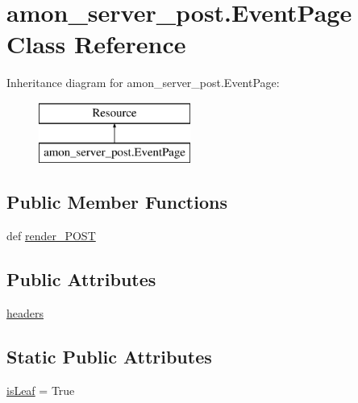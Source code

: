 \hypertarget{classamon__server__post_1_1_event_page}{\section{amon\-\_\-server\-\_\-post.\-Event\-Page Class Reference}
\label{classamon__server__post_1_1_event_page}
}
Inheritance diagram for amon\-\_\-server\-\_\-post.\-Event\-Page\-:\begin{figure}[H]
\begin{center}
\leavevmode
\includegraphics[height=2.000000cm]{classamon__server__post_1_1_event_page}
\end{center}
\end{figure}
\subsection*{Public Member Functions}
\begin{DoxyCompactItemize}
\item 
def \hyperlink{classamon__server__post_1_1_event_page_a47396ff6c7b3e54804a319a65fae04ef}{render\-\_\-\-P\-O\-S\-T}
\end{DoxyCompactItemize}
\subsection*{Public Attributes}
\begin{DoxyCompactItemize}
\item 
\hyperlink{classamon__server__post_1_1_event_page_aebe3efcc148ea3e5d0648b0bcd354652}{headers}
\end{DoxyCompactItemize}
\subsection*{Static Public Attributes}
\begin{DoxyCompactItemize}
\item 
\hyperlink{classamon__server__post_1_1_event_page_a79612515feec2007f430422f8b4dbbe4}{is\-Leaf} = True
\end{DoxyCompactItemize}


